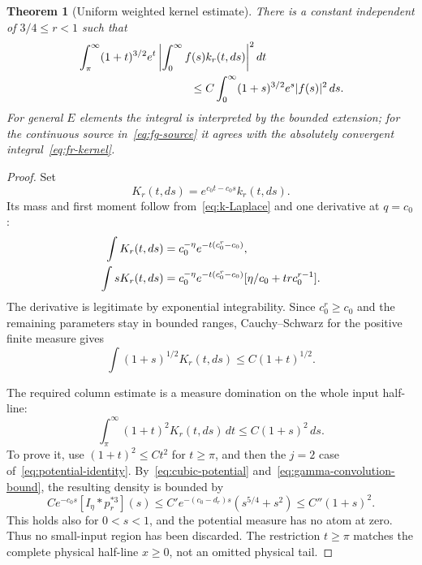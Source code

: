 \documentclass[11pt,a4paper]{article}
\numberwithin{equation}{section}
\newtheorem{theorem}{Theorem}[section]
\theoremstyle{definition}
\theoremstyle{remark}
\begin{document}
\begin{theorem}[Uniform weighted kernel estimate]\label{thm:weighted-kernel}
There is a constant independent of $3/4\le r<1$ such that
\begin{align}
 &\int_\pi^\infty(1+t)^{3/2}e^t
       \left|\int_0^\infty f(s)k_r(t,ds)\right|^2dt\notag\\
 &\hspace{35mm}\le C\int_0^\infty(1+s)^{3/2}e^s|f(s)|^2\,ds.
 \label{eq:uniform-kernel}
\end{align}
For general $E$ elements the integral is interpreted by the bounded extension; for the continuous source in~\eqref{eq:fg-source} it agrees with the absolutely convergent integral~\eqref{eq:fr-kernel}.
\end{theorem}
\begin{proof}
Set
\[
 K_r(t,ds)=e^{c_0t-c_0s}k_r(t,ds).
\]
Its mass and first moment follow from~\eqref{eq:k-Laplace} and one derivative at $q=c_0$:
\begin{align}
 \int K_r(t,ds)&=c_0^{-\eta}e^{-t(c_0^r-c_0)},\notag\\
 \int sK_r(t,ds)&=
 c_0^{-\eta}e^{-t(c_0^r-c_0)}
        [\eta/c_0+trc_0^{r-1}].
 \label{eq:kernel-moments}
\end{align}
The derivative is legitimate by exponential integrability. Since $c_0^r\ge c_0$ and the remaining parameters stay in bounded ranges, Cauchy--Schwarz for the positive finite measure gives
\begin{equation}\label{eq:Schur-row}
 \int(1+s)^{1/2}K_r(t,ds)\le C(1+t)^{1/2}.
\end{equation}

The required column estimate is a measure domination on the whole input half-line:
\begin{equation}\label{eq:Schur-column}
 \int_\pi^\infty(1+t)^2K_r(t,ds)\,dt
 \le C(1+s)^2\,ds.
\end{equation}
To prove it, use $(1+t)^2\le Ct^2$ for $t\ge\pi$, and then the $j=2$ case of~\eqref{eq:potential-identity}. By~\eqref{eq:cubic-potential} and~\eqref{eq:gamma-convolution-bound}, the resulting density is bounded by
\[
 C e^{-c_0s}[I_\eta*p_r^{*3}](s)
 \le C'e^{-(c_0-d_r)s}(s^{5/4}+s^2)
 \le C''(1+s)^2.
\]
This holds also for $0<s<1$, and the potential measure has no atom at zero. Thus no small-input region has been discarded. The restriction $t\ge\pi$ matches the complete physical half-line $x\ge0$, not an omitted physical tail.


\end{proof}
\end{document}
